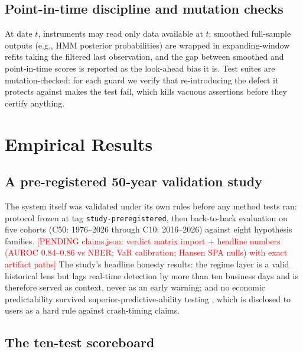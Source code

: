 \documentclass[11pt]{article}
\newcommand{\todoA}[1]{\textcolor{red}{[PENDING #1]}}
\begin{document}
\subsection{Point-in-time discipline and mutation checks}

At date $t$, instruments may read only data available at $t$; smoothed
full-sample outputs (e.g., HMM posterior probabilities) are wrapped in
expanding-window refits taking the filtered last observation, and the
gap between smoothed and point-in-time scores is reported as the
look-ahead bias it is. Test suites are mutation-checked: for each guard
we verify that re-introducing the defect it protects against makes the
test fail, which kills vacuous assertions before they certify anything.

\section{Empirical Results}\label{sec:results}

\subsection{A pre-registered 50-year validation study}\label{sec:study}

The system itself was validated under its own rules before any method
tests ran: protocol frozen at tag \texttt{study-preregistered}, then
back-to-back evaluation on five cohorts (C50: 1976--2026 through C10:
2016--2026) against eight hypothesis families. \todoA{claims.json:
verdict matrix import + headline numbers (AUROC 0.84--0.86 vs NBER;
VaR calibration; Hansen SPA nulls) with exact artifact paths}
The study's headline honesty results: the regime layer is a valid
historical lens but lags real-time detection by more than ten business
days and is therefore served as context, never as an early warning; and
no economic predictability survived superior-predictive-ability testing
\citep{hansen2005test}, which is disclosed to users as a hard rule
against crash-timing claims.

\subsection{The ten-test scoreboard}\label{sec:scoreboard}
\end{document}
